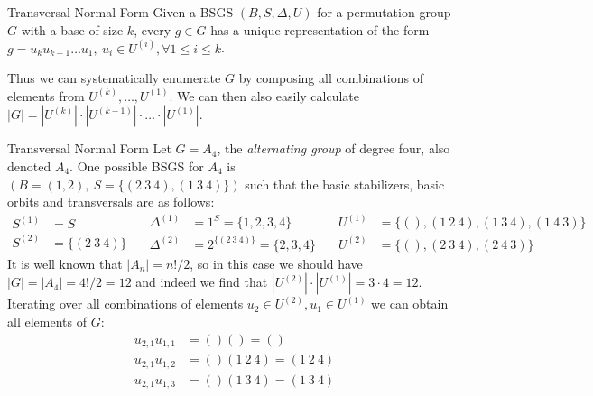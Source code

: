 \begin{thm}[label=thm:transversal_normal_form]{Transversal Normal Form}
  Given a BSGS ${(B, S, \Delta, U)}$ for a permutation group $G$ with a base of
  size $k$, every ${g \in G}$ has a unique representation of the form $g = u_k
  u_{k-1} \dots u_1,\ u_i \in U^{(i)}, \forall 1 \leq i \leq k$.
\end{thm}
%
Thus we can systematically enumerate $G$ by composing all combinations of
elements from $U^{(k)}, \dots, U^{(1)}$. We can then also easily calculate $|G|
= |U^{(k)}| \cdot |U^{(k-1)}| \cdot \dots \cdot |U^{(1)}|$.

\begin{exmp}[label=exmp:transversal_normal_form]{Transversal Normal Form}
  Let $G = A_4$, the \textit{alternating group} of degree four, also denoted
  $A_4$. One possible BSGS for $A_4$ is $(B = (1, 2),\ S = \{(2\ 3\ 4), (1\ 3\
  4)\})$ such that the basic stabilizers, basic orbits and transversals are as
  follows:
  \footnotesize
  \begin{equation*}
    \begin{split}
      S^{(1)} &= S \\
      S^{(2)} &= \{(2\ 3\ 4)\}
    \end{split}
    \quad
    \begin{split}
      \Delta^{(1)} &= 1^S = \{1, 2, 3, 4\} \\
      \Delta^{(2)} &= 2^{\{(2\ 3\ 4)\}} = \{2, 3, 4\}
    \end{split}
    \quad
    \begin{split}
      U^{(1)} &= \{(),(1\ 2\ 4),(1\ 3\ 4),(1\ 4\ 3)\} \\
      U^{(2)} &= \{(),(2\ 3\ 4),(2\ 4\ 3)\}
    \end{split}
  \end{equation*}
  \normalsize
  It is well known that $|A_n| = n! / 2$, so in this case we should
  have $|G| = |A_4| = 4! / 2 = 12$ and indeed we find that
  $|U^{(2)}| \cdot |U^{(1)}| = 3 \cdot 4 = 12$.
  Iterating over all combinations of elements $u_2 \in U^{(2)}, u_1 \in U^{(1)}$
  we can obtain all elements of $G$:
  \footnotesize
  \begin{equation*}
    \begin{split}
      u_{2,1} u_{1,1} &= () ()               = () \\
      u_{2,1} u_{1,2} &= () (1\ 2\ 4)        = (1\ 2\ 4) \\
      u_{2,1} u_{1,3} &= () (1\ 3\ 4)        = (1\ 3\ 4) \\

\end{split}
\end{equation*}
\end{exmp}
